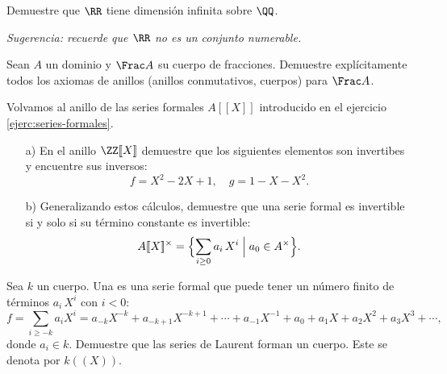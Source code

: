 \begin{ejercicio}
  Demuestre que $\RR$ tiene dimensión infinita sobre $\QQ$.

  \emph{Sugerencia: recuerde que $\RR$ no es un conjunto numerable.}
\end{ejercicio}

\begin{ejercicio}
  Sean $A$ un dominio y $\Frac A$ su cuerpo de fracciones. Demuestre
  explícitamente todos los axiomas de anillos (anillos conmutativos, cuerpos)
  para $\Frac A$.
\end{ejercicio}

\begin{ejercicio}
  Volvamos al anillo de las series formales $A [\![X]\!]$ introducido en el
  ejercicio \ref{ejerc:series-formales}.

  \begin{enumerate}
  \item[a)] En el anillo $\ZZ [\![X]\!]$ demuestre que los siguientes elementos
    son invertibes y encuentre sus inversos:
    $$f = X^2-2X+1, \quad g = 1 - X - X^2.$$

  \item[b)] Generalizando estos cálculos, demuestre que una serie formal es
    invertible si y solo si su término constante es invertible:
    $$A [\![X]\!]^\times = \Bigl\{ \sum_{i\ge 0} a_i\,X^i \Bigm| a_0 \in A^\times \Bigr\}.$$
  \end{enumerate}
\end{ejercicio}

\begin{ejercicio}
  Sea $k$ un cuerpo. Una  es una serie formal que puede
  tener un número finito de términos $a_i\,X^i$ con $i < 0$:
  $$f = \sum_{i\ge -k} a_i X^i = a_{-k} X^{-k} + a_{-k+1} X^{-k+1} + \cdots + a_{-1} X^{-1} + a_0 + a_1 X + a_2 X^2 + a_3 X^3 + \cdots,$$
  donde $a_i \in k$. Demuestre que las series de Laurent forman un cuerpo. Este
  se denota por $k (\!(X)\!)$.
\end{ejercicio}
